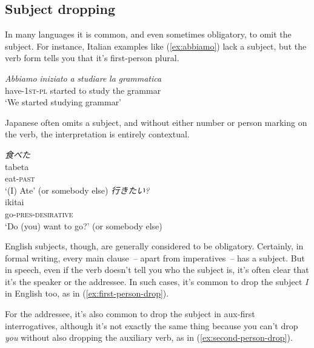 \subsection{Subject dropping}\label{sec:subject-dropping}
In many languages it is common, and even sometimes obligatory, to omit the subject. For instance, Italian examples like (\ref{ex:abbiamo}) lack a subject, but the verb form tells you that it's first-person plural.

\ea \label{ex:abbiamo}
    \gll \textit{Abbiamo} \textit{iniziato} \textit{a} \textit{studiare} \textit{la} \textit{grammatica} \\
    have-\textsc{1st-pl} started to study the grammar \\
        \glt `We started studying grammar'
\z
    
Japanese often omits a subject, and without either number or person marking on the verb, the interpretation is entirely contextual.

\ea
    \ea \label{ex:tabeta}
    \glll \textit{食べた} \\
    tabeta \\
    eat-\textsc{past} \\
    \glt `(I) Ate' (or somebody else)
    \ex \label{ex:ikitai}
    \glll \textit{行きたい?} \\
    ikitai \\
    go-\textsc{pres-desirative} \\
    \glt `Do (you) want to go?' (or somebody else)
    \z
\z

English subjects, though, are generally considered to be obligatory. Certainly, in formal writing, every main clause~-- apart from imperatives~-- has a subject. But in speech, even if the verb doesn't tell you who the subject is, it's often clear that it's the speaker or the addressee. In such cases, it's common to drop the subject \textit{I} in English too, as in (\ref{ex:first-person-drop}).

\ea  \label{ex:first-person-drop}
    \z
\z

For the addressee, it's also common to drop the subject in aux-first interrogatives, although it's not exactly the same thing because you can't drop \textit{you} without also dropping the auxiliary verb, as in (\ref{ex:second-person-drop}).

